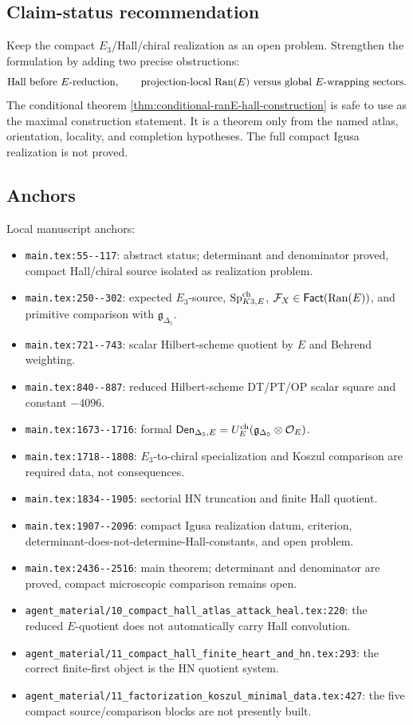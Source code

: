\subsection{Claim-status recommendation}

Keep the compact \(E_3\)/Hall/chiral realization as an open problem.
Strengthen the formulation by adding two precise obstructions:
\[
\hbox{Hall before }E\hbox{-reduction},
\qquad
\hbox{projection-local Ran(\(E\)) versus global \(E\)-wrapping sectors}.
\]
The conditional theorem
\ref{thm:conditional-ranE-hall-construction} is safe to use as the
maximal construction statement.  It is a theorem only from the named
atlas, orientation, locality, and completion hypotheses.  The full
compact Igusa realization is not proved.

\subsection{Anchors}

Local manuscript anchors:
\begin{itemize}
\item \verb|main.tex:55--117|: abstract status; determinant and
denominator proved, compact Hall/chiral source isolated as realization
problem.
\item \verb|main.tex:250--302|: expected \(E_3\)-source,
\(\mathrm{Sp}^{\mathrm{ch}}_{K3,E}\), \(\mathcal F_X\in\mathsf{Fact}(\operatorname{Ran}(E))\), and primitive
comparison with \(\mathfrak g_{\Delta_5}\).
\item \verb|main.tex:721--743|: scalar Hilbert-scheme quotient by \(E\)
and Behrend weighting.
\item \verb|main.tex:840--887|: reduced Hilbert-scheme DT/PT/OP scalar
square and constant \(-4096\).
\item \verb|main.tex:1673--1716|: formal
\(\mathsf{Den}_{\Delta_5,E}=U_E^{\mathrm{ch}}(\mathfrak g_{\Delta_5}\otimes
\mathcal O_E)\).
\item \verb|main.tex:1718--1808|: \(E_3\)-to-chiral specialization and
Koszul comparison are required data, not consequences.
\item \verb|main.tex:1834--1905|: sectorial HN truncation and finite
Hall quotient.
\item \verb|main.tex:1907--2096|: compact Igusa realization datum,
criterion, determinant-does-not-determine-Hall-constants, and open
problem.
\item \verb|main.tex:2436--2516|: main theorem; determinant and
denominator are proved, compact microscopic comparison remains open.
\item \verb|agent_material/10_compact_hall_atlas_attack_heal.tex:220|:
the reduced \(E\)-quotient does not automatically carry Hall convolution.
\item \verb|agent_material/11_compact_hall_finite_heart_and_hn.tex:293|:
the correct finite-first object is the HN quotient system.
\item \verb|agent_material/11_factorization_koszul_minimal_data.tex:427|:
the five compact source/comparison blocks are not presently built.
\end{itemize}

